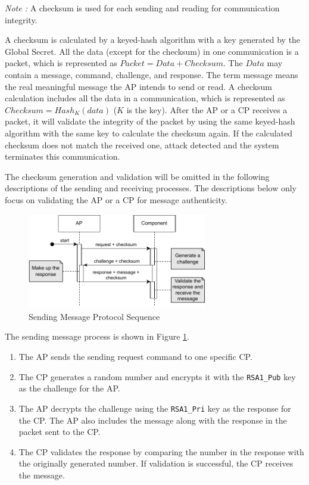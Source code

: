 \documentclass[11pt,oneside,onecolumn,letterpaper]{article}
\newcounter{alg}
\begin{document}
	\textit{Note :} A checksum is used for each sending and reading for communication integrity.
	
	A checksum is calculated by a keyed-hash algorithm with a key generated by the Global Secret.
	All the data (except for the checksum) in one communication is a packet,
	which is represented as $ Packet = Data + Checksum $.
	The $ Data $ may contain a message, command, challenge, and response.
	The term message means the real meaningful message the AP intends to send or read.
	A checksum calculation includes all the data in a communication,
	which is represented as $ Checksum = Hash_K(data) $ ($ K $ is the key).
	After the AP or a CP receives a packet,
	it will validate the integrity of the packet by using the same keyed-hash algorithm with the same key to calculate the checksum again.
	If the calculated checksum does not match the received one,
	attack detected and the system terminates this communication.
	
	The checksum generation and validation will be omitted in the following descriptions of the sending and receiving processes.
	The descriptions below only focus on validating the AP or a CP for message authenticity.
	
	\begin{figure}[h]
		\centering
		\includegraphics[width=0.7\textwidth]{pics/post1.pdf}
		\caption{Sending Message Protocol Sequence}
		\label{fig:functionality_post1}
	\end{figure}
	
	The sending message process is shown in Figure \ref{fig:functionality_post1}.
	\begin{enumerate}
		\item The AP sends the sending request command to one specific CP.
		\item The CP generates a random number and encrypts it with the \texttt{RSA1\_Pub} key as the challenge for the AP.
		\item The AP decrypts the challenge using the \texttt{RSA1\_Pri} key as the response for the CP.
		The AP also includes the message along with the response in the packet sent to the CP.
		\item The CP validates the response by comparing the number in the response with the originally generated number.
		If validation is successful,
		the CP receives the message.
	\end{enumerate}
	
\end{document}
